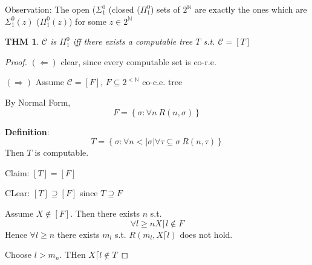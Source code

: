 \documentclass[12pt]{article}
\newcommand{\Nat}{\ensuremath{\mathbb{N}}}
\newcommand{\defn}{\textbf{Definition}: }
\begin{document}
Observation: The open (\textbf{$\Sigma^0_1$} (closed (\textbf{$\Pi^0_1$})
sets of $2^\Nat$ are exactly the ones which are $\Sigma^0_1(z)$
($\Pi^0_1(z)$) for some $z \in 2^\Nat$

\newtheorem*{thm}{THM}
\begin{thm}
  $\mathcal{C}$ is $\Pi^0_1$ iff there exists a computable tree $T$
  s.t. $\mathcal{C} = [T]$
\end{thm}
\begin{proof}
  $(\Leftarrow)$ clear, since every computable set is co-r.e.

$(\Rightarrow)$ Assume $\mathcal{C} = [F]$, $F \subseteq 2^{<\Nat}$ co-c.e. tree

By Normal Form,
\[
F = \left\{ \sigma : \forall n\ R(n, \sigma) \right\}
\]

\defn
\[
T = \left\{ \sigma : \forall n<|\sigma|
\forall \tau \subseteq \sigma\ R(n,\tau) \right\}
\]
Then $T$ is computable.

Claim: $[T] = [F]$

CLear: $[T] \supseteq [F]$ since $T \supseteq F$

Assume $X \not\in [F]$.
Then there exists $n$ s.t.
\[
\forall l \ge n X \lceil l \not\in F
\]
Hence $\forall l \ge n$ there exists $m_l$ s.t.
$R(m_l, X \lceil l)$ does not hold.

Choose $l > m_n$.  THen $X \lceil l \not\in T$
\end{proof}
\end{document}
